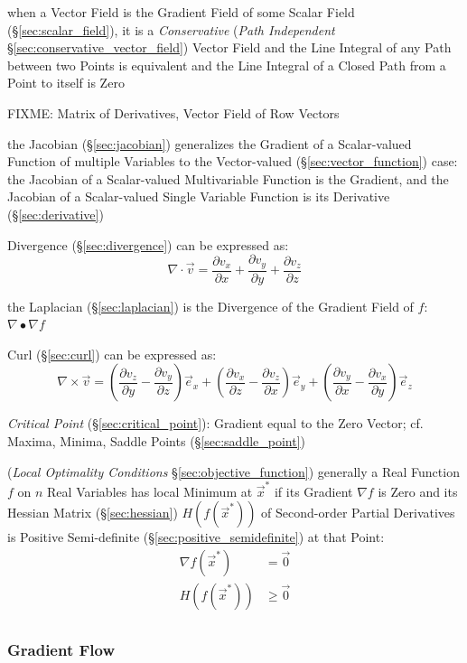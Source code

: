 {when a Vector Field is the Gradient Field of some Scalar Field
(\S\ref{sec:scalar_field}), it is a \emph{Conservative} (\emph{Path
  Independent} \S\ref{sec:conservative_vector_field}) Vector Field and the Line
Integral of any Path between two Points is equivalent and the Line Integral of
a Closed Path from a Point to itself is Zero

FIXME: Matrix of Derivatives, Vector Field of Row Vectors

the Jacobian (\S\ref{sec:jacobian}) generalizes the Gradient of a Scalar-valued
Function of multiple Variables to the Vector-valued
(\S\ref{sec:vector_function}) case: the Jacobian of a Scalar-valued
Multivariable Function is the Gradient, and the Jacobian of a Scalar-valued
Single Variable Function is its Derivative (\S\ref{sec:derivative})

Divergence (\S\ref{sec:divergence}) can be expressed as:
\[
  \nabla \cdot \vec{v} =
    \frac{\partial v_x}{\partial x} +
    \frac{\partial v_y}{\partial y} +
    \frac{\partial v_z}{\partial z}
\]

the Laplacian (\S\ref{sec:laplacian}) is the Divergence of the Gradient Field
of $f$: $\nabla \bullet \nabla f$

Curl (\S\ref{sec:curl}) can be expressed as:
\[
  \nabla\times\vec{v} =
    (\frac{\partial v_z}{\partial y}-\frac{\partial v_y}{\partial z})\vec{e}_x +
    (\frac{\partial v_x}{\partial z}-\frac{\partial v_z}{\partial x})\vec{e}_y +
    (\frac{\partial v_y}{\partial x}-\frac{\partial v_x}{\partial y})\vec{e}_z
\]

\emph{Critical Point} (\S\ref{sec:critical_point}): Gradient equal to the Zero
Vector; cf. Maxima, Minima, Saddle Points (\S\ref{sec:saddle_point})

(\emph{Local Optimality Conditions} \S\ref{sec:objective_function}) generally a
Real Function $f$ on $n$ Real Variables has local Minimum at $\vec{x}^*$ if its
Gradient $\nabla f$ is Zero and its Hessian Matrix (\S\ref{sec:hessian})
$H(f(\vec{x}^*))$ of Second-order Partial Derivatives is Positive Semi-definite
(\S\ref{sec:positive_semidefinite}) at that Point:
\begin{align*}
  \nabla f(\vec{x}^*) & =    \vec{0} \\
  H(f(\vec{x}^*))     & \geq \vec{0} \\
\end{align*}



\subsubsection{Gradient Flow}\label{sec:gradient_flow}

}
